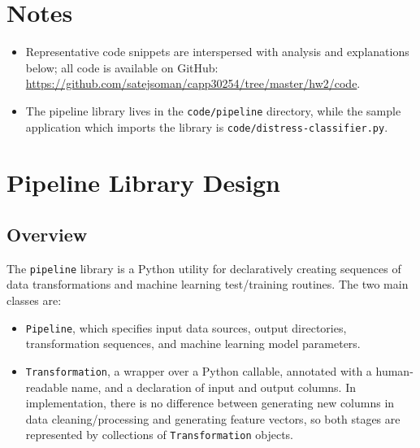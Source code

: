 \documentclass[11pt]{article}
\begin{document}
\begin{titlepage}
\raggedleft\huge\headerfontlt{
\textcolor{darkgray}{Satej Soman\\
CAPP30254: Machine Learning for Public Policy\\
Spring 2019}}

\vspace{240pt}
\Huge\headerfontlt{\textcolor{darkgray}{HW 2\\MACHINE LEARNING PIPELINE}}
\vfill
\normalfont \normalsize
\tableofcontents

\end{titlepage}
\section*{Notes}
\begin{itemize}
\item Representative code snippets are interspersed with analysis and explanations below; all code is available on GitHub: \url{https://github.com/satejsoman/capp30254/tree/master/hw2/code}.
\item The pipeline library lives in the \texttt{code/pipeline} directory, while the sample application which imports the library is \texttt{code/distress-classifier.py}.
\end{itemize}

\section{Pipeline Library Design}
\subsection{Overview}
The \texttt{pipeline} library is a Python utility for declaratively creating sequences of data transformations and machine learning test/training routines. The two main classes are: 

\begin{itemize}
\item \texttt{Pipeline}, which specifies input data sources, output directories, transformation sequences, and machine learning model parameters.
\item \texttt{Transformation}, a wrapper over a Python callable, annotated with a human-readable name, and a declaration of input and output columns. In implementation, there is no difference between generating new columns in data cleaning/processing and generating feature vectors, so both stages are represented by collections of \texttt{Transformation} objects. 
\end{itemize}
\end{document}
